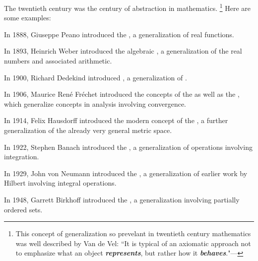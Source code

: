 The twentieth century was the century of abstraction in mathematics.%
\footnote{This concept of generalization so prevelant in 
twentieth century mathematics was well described by Van de Vel:
``It is typical of an axiomatic approach not to emphasize what an object \emph{\bf represents},
but rather how it \emph{\bf behaves}."---
}
Here are some examples:
\begin{liste}
  \item In 1888, Giuseppe Peano introduced the , 
        a generalization of real functions.

  \item In 1893, Heinrich Weber introduced the algebraic , 
        a generalization of the real numbers and associated arithmetic.

  \item In 1900, Richard Dedekind introduced , a generalization of
        .

  \item In 1906, Maurice Ren\'e Fr\'echet
        introduced the concepts of the  as well as the 
        , which generalize concepts in analysis involving 
        convergence.

  \item In 1914, Felix Hausdorff introduced the modern concept of the 
        , a further generalization of the 
        already very general metric space.

  \item In 1922, Stephen Banach introduced the ,
        a generalization of operations involving integration.

  \item In 1929, John von Neumann introduced the , a 
        generalization of earlier work by Hilbert involving integral operations.

  \item In 1948, Garrett Birkhoff introduced the ,
        a generalization involving partially ordered sets.
\end{liste}

